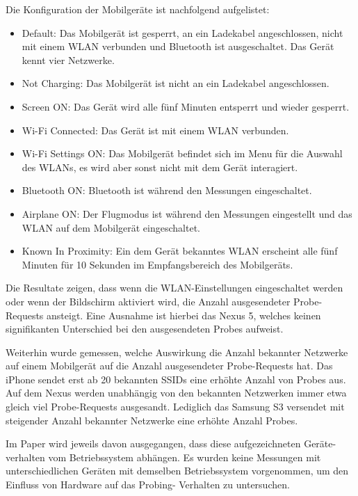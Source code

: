 Die Konfiguration der Mobilgeräte ist nachfolgend aufgelistet:
\begin{itemize}
    \item Default: Das Mobilgerät ist gesperrt, an ein Ladekabel angeschlossen,
    nicht mit einem WLAN verbunden und Bluetooth ist ausgeschaltet. Das Gerät
    kennt vier Netzwerke.
    \item Not Charging: Das Mobilgerät ist nicht an ein Ladekabel angeschlossen.
    \item Screen ON: Das Gerät wird alle fünf Minuten entsperrt und wieder gesperrt.
    \item Wi-Fi Connected: Das Gerät ist mit einem WLAN verbunden.
    \item Wi-Fi Settings ON: Das Mobilgerät befindet sich im Menu für die Auswahl 
    des WLANs, es wird aber sonst nicht mit dem Gerät interagiert.
    \item Bluetooth ON: Bluetooth ist während den Messungen eingeschaltet.
    \item Airplane ON: Der Flugmodus ist während den Messungen eingestellt und
    das WLAN auf dem Mobilgerät eingeschaltet.
    \item Known In Proximity: Ein dem Gerät bekanntes WLAN erscheint alle fünf
    Minuten für 10 Sekunden im Empfangsbereich des Mobilgeräts.
\end{itemize}
Die Resultate zeigen, dass wenn die WLAN-Einstellungen eingeschaltet werden 
oder wenn der Bildschirm aktiviert wird, die Anzahl ausgesendeter
Probe-Requests ansteigt. 
Eine Ausnahme ist hierbei das Nexus 5, welches keinen signifikanten Unterschied
bei den ausgesendeten Probes aufweist.

Weiterhin wurde gemessen, welche Auswirkung die Anzahl bekannter Netzwerke 
auf einem Mobilgerät auf die Anzahl ausgesendeter Probe-Requests hat.
Das iPhone sendet erst ab 20 bekannten SSIDs eine erhöhte Anzahl von Probes aus.
Auf dem Nexus werden unabhängig von den bekannten Netzwerken immer etwa gleich
viel Probe-Requests ausgesandt.
Lediglich das Samsung S3 versendet mit steigender Anzahl bekannter Netzwerke
eine erhöhte Anzahl Probes.

Im Paper wird jeweils davon ausgegangen, dass diese aufgezeichneten 
Geräte-verhalten vom Betriebssystem abhängen. 
Es wurden keine Messungen mit unterschiedlichen Geräten mit demselben
Betriebssystem vorgenommen, um den Einfluss von Hardware auf das Probing-
Verhalten zu untersuchen.

\clearpage

